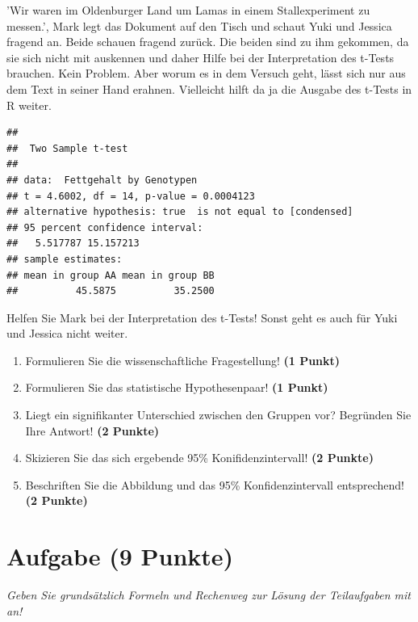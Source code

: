 \documentclass[a4paper, 9pt]{scrartcl}\usepackage[]{graphicx}\usepackage[]{xcolor}
\makeatletter
\newenvironment{kframe}{%
 \def\at@end@of@kframe{}%
 \ifinner\ifhmode%
  \def\at@end@of@kframe{\end{minipage}}%
  \begin{minipage}{\columnwidth}%
 \fi\fi%
 \def\FrameCommand##1{\hskip\@totalleftmargin \hskip-\fboxsep
 \colorbox{shadecolor}{##1}\hskip-\fboxsep
     \hskip-\linewidth \hskip-\@totalleftmargin \hskip\columnwidth}%
 \MakeFramed {\advance\hsize-\width
   \@totalleftmargin\z@ \linewidth\hsize
   \@setminipage}}%
 {\par\unskip\endMakeFramed%
 \at@end@of@kframe}
\newenvironment{knitrout}{}{} %
\makeatother
\begin{document}
'Wir waren im Oldenburger Land um Lamas in einem Stallexperiment zu messen.', Mark legt das Dokument auf den Tisch und schaut Yuki und Jessica fragend an. Beide schauen fragend zurück. Die beiden sind zu ihm gekommen, da sie sich nicht mit \Rlogo auskennen und daher Hilfe bei der Interpretation des t-Tests brauchen. Kein Problem. Aber worum es in dem Versuch geht, lässt sich nur aus dem Text in seiner Hand erahnen. Vielleicht hilft da ja die Ausgabe des t-Tests in R weiter.

\begin{knitrout}
\color{fgcolor}\begin{kframe}
\begin{verbatim}
## 
## 	Two Sample t-test
## 
## data:  Fettgehalt by Genotypen
## t = 4.6002, df = 14, p-value = 0.0004123
## alternative hypothesis: true  is not equal to [condensed]
## 95 percent confidence interval:
##   5.517787 15.157213
## sample estimates:
## mean in group AA mean in group BB 
##          45.5875          35.2500
\end{verbatim}
\end{kframe}
\end{knitrout}

Helfen Sie Mark bei der Interpretation des t-Tests! Sonst geht es auch für Yuki und Jessica nicht weiter.

\begin{enumerate}
  \item Formulieren Sie die wissenschaftliche Fragestellung! \textbf{(1 Punkt)}
  \item Formulieren Sie das statistische Hypothesenpaar! \textbf{(1 Punkt)}
\item Liegt ein signifikanter Unterschied zwischen den Gruppen vor? Begründen Sie Ihre Antwort! \textbf{(2 Punkte)}
\item Skizieren Sie das sich ergebende 95\% Konifidenzintervall! \textbf{(2 Punkte)}
\item Beschriften Sie die Abbildung und das 95\% Konfidenzintervall entsprechend! \textbf{(2 Punkte)}  
\end{enumerate} 
\clearpage

\section{Aufgabe \hfill (9 Punkte)}

\textit{Geben Sie grundsätzlich Formeln und Rechenweg zur Lösung der Teilaufgaben mit an!} \\[1Ex]
 
\end{document}
